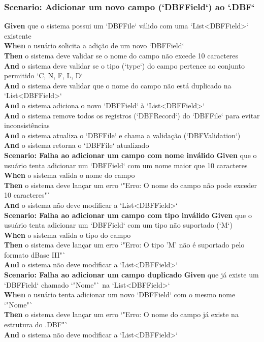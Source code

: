 \subsubsection{Scenario: Adicionar um novo campo (`DBFField`) ao `.DBF`}
\textbf{Given} que o sistema possui um `DBFFile` válido com uma `List<DBFField>` existente \\
\textbf{When} o usuário solicita a adição de um novo `DBFField` \\
\textbf{Then} o sistema deve validar se o nome do campo não excede 10 caracteres \\
\textbf{And} o sistema deve validar se o tipo (`type`) do campo pertence ao conjunto permitido `{C, N, F, L, D}` \\
\textbf{And} o sistema deve validar que o nome do campo não está duplicado na `List<DBFField>` \\
\textbf{And} o sistema adiciona o novo `DBFField` à `List<DBFField>` \\
\textbf{And} o sistema remove todos os registros (`DBFRecord`) do `DBFFile` para evitar inconsistências \\
\textbf{And} o sistema atualiza o `DBFFile` e chama a validação (`DBFValidation`) \\
\textbf{And} o sistema retorna o `DBFFile` atualizado \\

\textbf{Scenario: Falha ao adicionar um campo com nome inválido}
\textbf{Given} que o usuário tenta adicionar um `DBFField` com um nome maior que 10 caracteres \\
\textbf{When} o sistema valida o nome do campo \\
\textbf{Then} o sistema deve lançar um erro `"Erro: O nome do campo não pode exceder 10 caracteres"` \\
\textbf{And} o sistema não deve modificar a `List<DBFField>` \\

\textbf{Scenario: Falha ao adicionar um campo com tipo inválido}
\textbf{Given} que o usuário tenta adicionar um `DBFField` com um tipo não suportado (`M`) \\
\textbf{When} o sistema valida o tipo do campo \\
\textbf{Then} o sistema deve lançar um erro `"Erro: O tipo 'M' não é suportado pelo formato dBase III"` \\
\textbf{And} o sistema não deve modificar a `List<DBFField>` \\

\textbf{Scenario: Falha ao adicionar um campo duplicado}
\textbf{Given} que já existe um `DBFField` chamado `"Nome"` na `List<DBFField>` \\
\textbf{When} o usuário tenta adicionar um novo `DBFField` com o mesmo nome `"Nome"` \\
\textbf{Then} o sistema deve lançar um erro `"Erro: O nome do campo já existe na estrutura do .DBF"` \\
\textbf{And} o sistema não deve modificar a `List<DBFField>` \\

